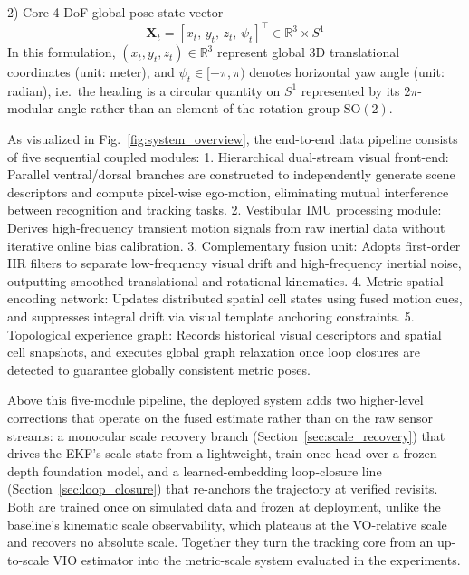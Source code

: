 2) Core 4-DoF global pose state vector
\begin{equation}
    \mathbf{X}_t = \left[ x_t,\, y_t,\, z_t,\, \psi_t \right]^\top \in \mathbb{R}^3 \times S^1
    \label{eq:global_state}
\end{equation}
In this formulation, $(x_t, y_t, z_t) \in \mathbb{R}^3$ represent global 3D translational coordinates (unit: meter), and $\psi_t \in [-\pi,\pi)$ denotes horizontal yaw angle (unit: radian), i.e.\ the heading is a circular quantity on $S^1$ represented by its $2\pi$-modular angle rather than an element of the rotation group $\mathrm{SO}(2)$.

As visualized in Fig.~\ref{fig:system_overview}, the end-to-end data pipeline consists of five sequential coupled modules:
1. Hierarchical dual-stream visual front-end: Parallel ventral/dorsal branches are constructed to independently generate scene descriptors and compute pixel-wise ego-motion, eliminating mutual interference between recognition and tracking tasks.
2. Vestibular IMU processing module: Derives high-frequency transient motion signals from raw inertial data without iterative online bias calibration.
3. Complementary fusion unit: Adopts first-order IIR filters to separate low-frequency visual drift and high-frequency inertial noise, outputting smoothed translational and rotational kinematics.
4. Metric spatial encoding network: Updates distributed spatial cell states using fused motion cues, and suppresses integral drift via visual template anchoring constraints.
5. Topological experience graph: Records historical visual descriptors and spatial cell snapshots, and executes global graph relaxation once loop closures are detected to guarantee globally consistent metric poses.

\noindent Above this five-module pipeline, the deployed system adds two higher-level corrections that operate on the fused estimate rather than on the raw sensor streams: a monocular scale recovery branch (Section~\ref{sec:scale_recovery}) that drives the EKF's scale state from a lightweight, train-once head over a frozen depth foundation model, and a learned-embedding loop-closure line (Section~\ref{sec:loop_closure}) that re-anchors the trajectory at verified revisits. Both are trained once on simulated data and frozen at deployment, unlike the baseline's kinematic scale observability, which plateaus at the VO-relative scale and recovers no absolute scale. Together they turn the tracking core from an up-to-scale VIO estimator into the metric-scale system evaluated in the experiments.

